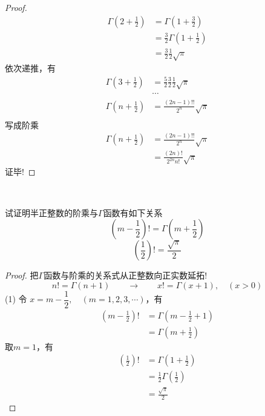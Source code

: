 \begin{proof}
\[\begin{aligned}
			\Gamma(2+\frac{1}{2})&= \Gamma(1+\frac{3}{2}) \\
			&=\frac{3}{2} \Gamma(1+\frac{1}{2}) \\
			&= \frac{3}{2}\frac{1}{2}\sqrt{\pi}
		\end{aligned} 
		  \]
		依次递推，有
		  \[
		\begin{aligned}
			\Gamma(3+\frac{1}{2})& = \frac{5}{2} \frac{3}{2}\frac{1}{2}\sqrt{\pi}\\
			&\cdots \\
			\Gamma(n+\frac{1}{2})& = \frac{(2n-1)!!}{2^n}\sqrt{\pi}\\
		\end{aligned} 
		  \]
		写成阶乘
		  \[
		\begin{aligned}
			\Gamma(n+\frac{1}{2})& = \frac{(2n-1)!!}{2^n}\sqrt{\pi}\\
			 & = \frac{(2n)!}{2^{2n} n!}\sqrt{\pi}
		\end{aligned} 
		  \]
		证毕!
	\end{proof}
	~~\\
	
	\begin{example}
		试证明半正整数的阶乘与$\Gamma$函数有如下关系
		\[ (m-\frac{1}{2})! =\Gamma (m+\frac{1}{2}) \]
		\[(\frac{1}{2})! =  \frac{\sqrt{\pi}}{2}\]
		\end{example}
		\begin{proof}
			把$\Gamma$函数与阶乘的关系式从正整数向正实数延拓!
			\[n!=\Gamma(n+1)\qquad \to \qquad x!=\Gamma(x+1), \quad (x>0)\]
			(1) 令 $x=m-\dfrac{1}{2}, \quad (m=1,2,3, \cdots )$，有
			\[ \begin{aligned}
				(m-\frac{1}{2})! &= \Gamma (m-\frac{1}{2}+1) \\
								 &= \Gamma (m+\frac{1}{2})
			\end{aligned} \]
			取$m=1$，有
			\[ \begin{aligned}
				(\frac{1}{2})! &= \Gamma (1+\frac{1}{2}) \\
							&= \frac{1}{2}\Gamma (\frac{1}{2}) \\
							&= \frac{\sqrt{\pi}}{2}
			\end{aligned} \]
		\end{proof}
	
